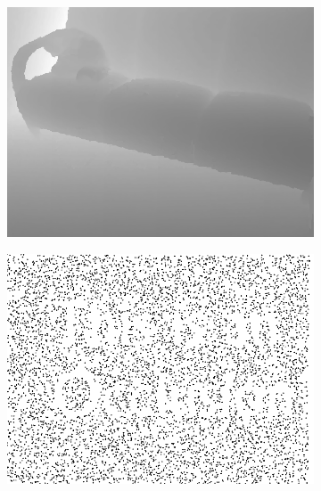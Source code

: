\documentclass[preprint,10pt,5p,times,twocolumn]{elsarticle}
\begin{document}
\begin{figure}[t]
\begin{center}
\begin{subfigure}[b]{0.136\linewidth}
    \includegraphics[width=\linewidth]{sofa_structure_missing_inpainting.png}
\end{subfigure}
\begin{subfigure}[b]{0.136\linewidth}
    \includegraphics[width=\linewidth]{sofa_random_missing_depth.png}
\end{subfigure}
\begin{subfigure}[b]{0.136\linewidth}

\end{subfigure}
\end{center}
\end{figure}
\end{document}
